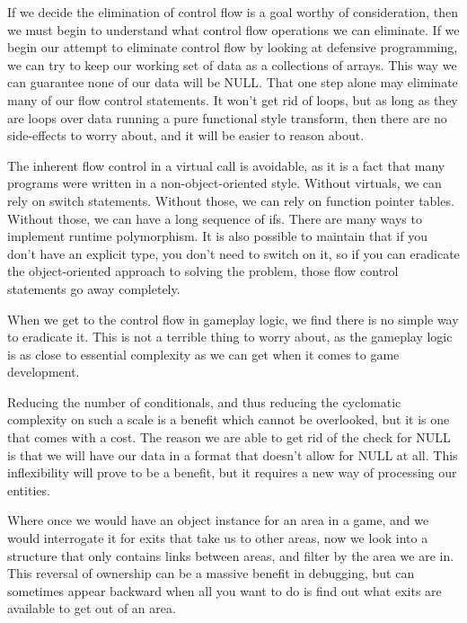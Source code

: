 \documentclass[a4paper,12pt]{article}
\begin{document}
If we decide the elimination of control flow is a goal worthy of consideration, then we must begin to understand what control flow operations we can eliminate.
If we begin our attempt to eliminate control flow by looking at defensive programming, we can try to keep our working set of data as a collections of arrays.
This way we can guarantee none of our data will be NULL.
That one step alone may eliminate many of our flow control statements.
It won't get rid of loops, but as long as they are loops over data running a pure functional style transform, then there are no side-effects to worry about, and it will be easier to reason about.

The inherent flow control in a virtual call is avoidable, as it is a fact that many programs were written in a non-object-oriented style.
Without virtuals, we can rely on switch statements.
Without those, we can rely on function pointer tables.
Without those, we can have a long sequence of ifs.
There are many ways to implement runtime polymorphism.
It is also possible to maintain that if you don't have an explicit type, you don't need to switch on it, so if you can eradicate the object-oriented approach to solving the problem, those flow control statements go away completely.

When we get to the control flow in gameplay logic, we find there is no simple way to eradicate it.
This is not a terrible thing to worry about, as the gameplay logic is as close to essential complexity as we can get when it comes to game development.

Reducing the number of conditionals, and thus reducing the cyclomatic complexity on such a scale is a benefit which cannot be overlooked, but it is one that comes with a cost.
The reason we are able to get rid of the check for NULL is that we will have our data in a format that doesn't allow for NULL at all.
This inflexibility will prove to be a benefit, but it requires a new way of processing our entities.

Where once we would have an object instance for an area in a game, and we would interrogate it for exits that take us to other areas, now we look into a structure that only contains links between areas, and filter by the area we are in.
This reversal of ownership can be a massive benefit in debugging, but can sometimes appear backward when all you want to do is find out what exits are available to get out of an area.
\end{document}
